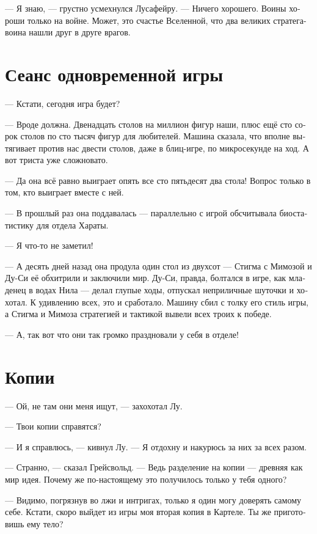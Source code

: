 \documentclass[a4paper,12pt,fleqn]{book}\usepackage{cooltooltips}\usepackage{polyglossia}\setdefaultlanguage[babelshorthands=true]{russian}\setotherlanguage{english}\defaultfontfeatures{Ligatures=TeX,Mapping=tex-text} \usepackage{xcolor}\definecolor{lightgray}{HTML}{bbbbbb}\color{lightgray}\newcommand{\ml}[3]{\textenglish{\textcolor{black}{#3}}}
\begin{document}
{--- Я знаю, --- грустно усмехнулся Лусафейру.
--- Ничего хорошего.
Воины хороши только на войне.
Может, это счастье Вселенной, что два великих стратега-воина нашли друг в друге врагов.

\section{Сеанс одновременной игры}

--- Кстати, сегодня игра будет?

--- Вроде должна.
Двенадцать столов на миллион фигур наши, плюс ещё сто сорок столов по сто тысяч фигур для любителей.
Машина сказала, что вполне вытягивает против нас двести столов, даже в блиц-игре, по микросекунде на ход.
А вот триста уже сложновато.

--- Да она всё равно выиграет опять все сто пятьдесят два стола!
Вопрос только в том, кто выиграет вместе с ней.

--- В прошлый раз она поддавалась --- параллельно с игрой обсчитывала биостатистику для отдела Хараты.

--- Я что-то не заметил!

--- А десять дней назад она продула один стол из двухсот --- Стигма с Мимозой и Ду-Си её обхитрили и заключили мир.
Ду-Си, правда, болтался в игре, как младенец в водах Нила --- делал глупые ходы, отпускал неприличные шуточки и хохотал.
К удивлению всех, это и сработало.
Машину сбил с толку его стиль игры, а Стигма и Мимоза стратегией и тактикой вывели всех троих к победе.

--- А, так вот что они так громко праздновали у себя в отделе!

\section{Копии}

--- Ой, не там они меня ищут, --- захохотал Лу.

--- Твои копии справятся?

--- И я справлюсь, --- кивнул Лу.
--- Я отдохну и накурюсь за них за всех разом.

--- Странно, --- сказал Грейсвольд.
--- Ведь разделение на копии --- древняя как мир идея.
Почему же по-настоящему это получилось только у тебя одного?

--- Видимо, погрязнув во лжи и интригах, только я один могу доверять самому себе.
Кстати, скоро выйдет из игры моя вторая копия в Картеле.
Ты же приготовишь ему тело?

}
\end{document}
